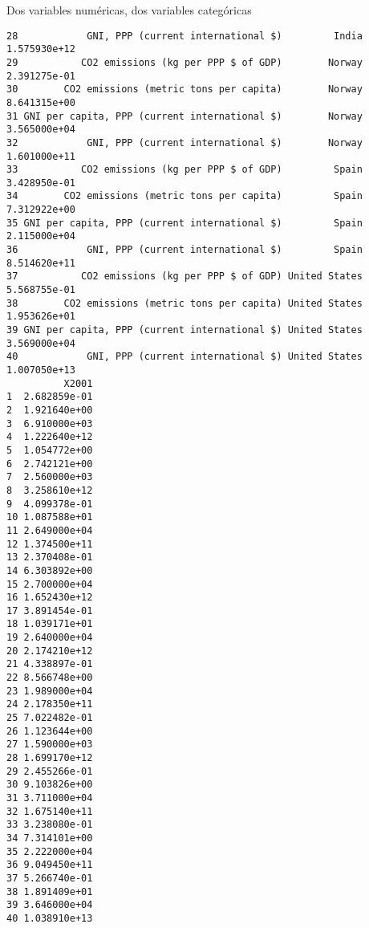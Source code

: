 \documentclass[xcolor={usenames,svgnames,dvipsnames}]{beamer}
\begin{document}
\begin{frame}[fragile,label=sec-2-2-4]{Dos variables numéricas, dos variables categóricas}
\begin{verbatim}
28            GNI, PPP (current international $)         India 1.575930e+12
29           CO2 emissions (kg per PPP $ of GDP)        Norway 2.391275e-01
30        CO2 emissions (metric tons per capita)        Norway 8.641315e+00
31 GNI per capita, PPP (current international $)        Norway 3.565000e+04
32            GNI, PPP (current international $)        Norway 1.601000e+11
33           CO2 emissions (kg per PPP $ of GDP)         Spain 3.428950e-01
34        CO2 emissions (metric tons per capita)         Spain 7.312922e+00
35 GNI per capita, PPP (current international $)         Spain 2.115000e+04
36            GNI, PPP (current international $)         Spain 8.514620e+11
37           CO2 emissions (kg per PPP $ of GDP) United States 5.568755e-01
38        CO2 emissions (metric tons per capita) United States 1.953626e+01
39 GNI per capita, PPP (current international $) United States 3.569000e+04
40            GNI, PPP (current international $) United States 1.007050e+13
          X2001
1  2.682859e-01
2  1.921640e+00
3  6.910000e+03
4  1.222640e+12
5  1.054772e+00
6  2.742121e+00
7  2.560000e+03
8  3.258610e+12
9  4.099378e-01
10 1.087588e+01
11 2.649000e+04
12 1.374500e+11
13 2.370408e-01
14 6.303892e+00
15 2.700000e+04
16 1.652430e+12
17 3.891454e-01
18 1.039171e+01
19 2.640000e+04
20 2.174210e+12
21 4.338897e-01
22 8.566748e+00
23 1.989000e+04
24 2.178350e+11
25 7.022482e-01
26 1.123644e+00
27 1.590000e+03
28 1.699170e+12
29 2.455266e-01
30 9.103826e+00
31 3.711000e+04
32 1.675140e+11
33 3.238080e-01
34 7.314101e+00
35 2.222000e+04
36 9.049450e+11
37 5.266740e-01
38 1.891409e+01
39 3.646000e+04
40 1.038910e+13
\end{verbatim}
\end{frame}
\end{document}

